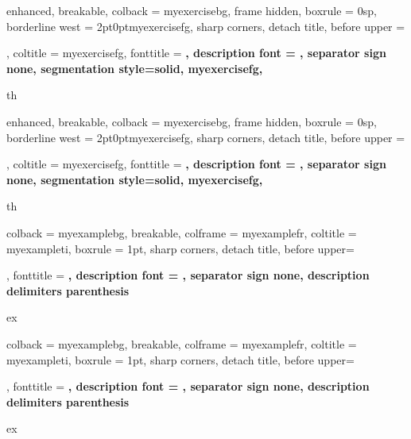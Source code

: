
{%
  enhanced,
  breakable,
  colback = myexercisebg,
  frame hidden,
  boxrule = 0sp,
  borderline west = {2pt}{0pt}{myexercisefg},
  sharp corners,
  detach title,
  before upper = \tcbtitle\par\smallskip,
  coltitle = myexercisefg,
  fonttitle = \bfseries\sffamily,
  description font = \mdseries,
  separator sign none,
  segmentation style={solid, myexercisefg},
}
{th}

{%
  enhanced,
  breakable,
  colback = myexercisebg,
  frame hidden,
  boxrule = 0sp,
  borderline west = {2pt}{0pt}{myexercisefg},
  sharp corners,
  detach title,
  before upper = \tcbtitle\par\smallskip,
  coltitle = myexercisefg,
  fonttitle = \bfseries\sffamily,
  description font = \mdseries,
  separator sign none,
  segmentation style={solid, myexercisefg},
}
{th}


{%
  colback = myexamplebg,
  breakable,
  colframe = myexamplefr,
  coltitle = myexampleti,
  boxrule = 1pt,
  sharp corners,
  detach title,
  before upper=\tcbtitle\par\smallskip,
  fonttitle = \sffamily\bfseries,
  description font = \mdseries,
  separator sign none,
  description delimiters parenthesis
}
{ex}

{%
  colback = myexamplebg,
  breakable,
  colframe = myexamplefr,
  coltitle = myexampleti,
  boxrule = 1pt,
  sharp corners,
  detach title,
  before upper=\tcbtitle\par\smallskip,
  fonttitle = \sffamily\bfseries,
  description font = \mdseries,
  separator sign none,
  description delimiters parenthesis
}
{ex}


